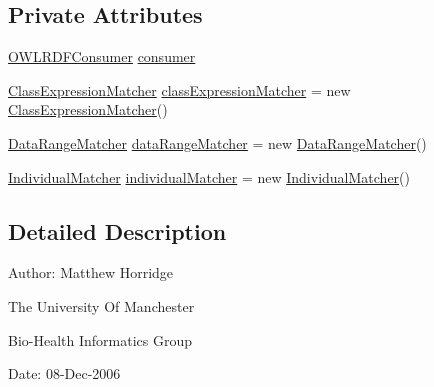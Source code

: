 \subsection*{Private Attributes}
\begin{DoxyCompactItemize}
\item 
\hyperlink{classorg_1_1coode_1_1owlapi_1_1rdfxml_1_1parser_1_1_o_w_l_r_d_f_consumer}{O\-W\-L\-R\-D\-F\-Consumer} \hyperlink{classorg_1_1coode_1_1owlapi_1_1rdfxml_1_1parser_1_1_abstract_class_expression_translator_ae547084cdd5b92c03835b5aa404f823b}{consumer}
\item 
\hyperlink{classorg_1_1coode_1_1owlapi_1_1rdfxml_1_1parser_1_1_abstract_class_expression_translator_1_1_class_expression_matcher}{Class\-Expression\-Matcher} \hyperlink{classorg_1_1coode_1_1owlapi_1_1rdfxml_1_1parser_1_1_abstract_class_expression_translator_a42ecc3790cc8d3dbf5897fee62b815a0}{class\-Expression\-Matcher} = new \hyperlink{classorg_1_1coode_1_1owlapi_1_1rdfxml_1_1parser_1_1_abstract_class_expression_translator_1_1_class_expression_matcher}{Class\-Expression\-Matcher}()
\item 
\hyperlink{classorg_1_1coode_1_1owlapi_1_1rdfxml_1_1parser_1_1_abstract_class_expression_translator_1_1_data_range_matcher}{Data\-Range\-Matcher} \hyperlink{classorg_1_1coode_1_1owlapi_1_1rdfxml_1_1parser_1_1_abstract_class_expression_translator_a9155dafa195caa9f2fd6f65c6c126eba}{data\-Range\-Matcher} = new \hyperlink{classorg_1_1coode_1_1owlapi_1_1rdfxml_1_1parser_1_1_abstract_class_expression_translator_1_1_data_range_matcher}{Data\-Range\-Matcher}()
\item 
\hyperlink{classorg_1_1coode_1_1owlapi_1_1rdfxml_1_1parser_1_1_abstract_class_expression_translator_1_1_individual_matcher}{Individual\-Matcher} \hyperlink{classorg_1_1coode_1_1owlapi_1_1rdfxml_1_1parser_1_1_abstract_class_expression_translator_a81b95478f77adb98d29d35c3be29ebef}{individual\-Matcher} = new \hyperlink{classorg_1_1coode_1_1owlapi_1_1rdfxml_1_1parser_1_1_abstract_class_expression_translator_1_1_individual_matcher}{Individual\-Matcher}()
\end{DoxyCompactItemize}


\subsection{Detailed Description}
Author\-: Matthew Horridge\par
 The University Of Manchester\par
 Bio-\/\-Health Informatics Group\par
 Date\-: 08-\/\-Dec-\/2006\par
\par
 

